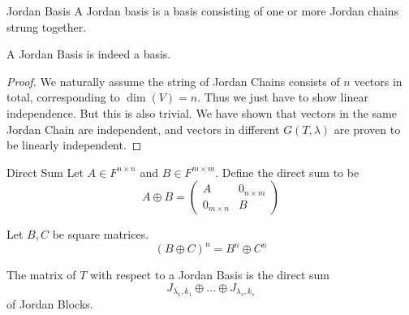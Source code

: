 \documentclass[a4paper]{article}
\begin{document}
\begin{defn}{Jordan Basis}{} A Jordan basis is a basis consisting of one or more Jordan chains strung together. 
\end{defn}

\begin{lmm}{}{} A Jordan Basis is indeed a basis. \tcbline
\begin{proof} We naturally assume the string of Jordan Chains consists of $n$ vectors in total, corresponding to $\dim(V)=n$. Thus we just have to show linear independence. But this is also trivial. We have shown that vectors in the same Jordan Chain are independent, and vectors in different $G(T,\lambda)$ are proven to be linearly independent. 
\end{proof}
\end{lmm}

\begin{defn}{Direct Sum}{} Let $A\in F^{n\times n}$ and $B\in F^{m\times m}$. Define the direct sum to be $$A\oplus B=\begin{pmatrix}
A & 0_{n\times m}\\
0_{m\times n} & B
\end{pmatrix}$$
\end{defn}

\begin{lmm}{}{} Let $B,C$ be square matrices. $$(B\oplus C)^n=B^n\oplus C^n$$
\end{lmm}

\begin{crl}{}{} The matrix of $T$ with respect to a Jordan Basis is the direct sum $$J_{\lambda_1,k_1}\oplus\dots\oplus J_{\lambda_s,k_s}$$ of Jordan Blocks. 
\end{crl}
\end{document}
